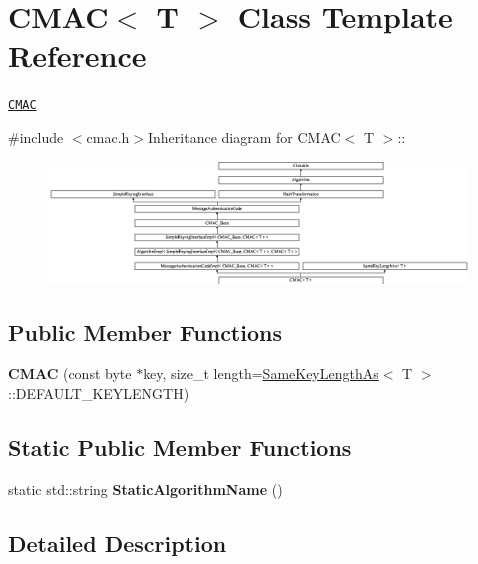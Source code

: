 \hypertarget{class_c_m_a_c}{
\section{CMAC$<$ T $>$ Class Template Reference}
\label{class_c_m_a_c}
}


\href{http://www.cryptolounge.org/wiki/CMAC}{\tt CMAC}  


{\ttfamily \#include $<$cmac.h$>$}Inheritance diagram for CMAC$<$ T $>$::\begin{figure}[H]
\begin{center}
\leavevmode
\includegraphics[height=3.23077cm]{class_c_m_a_c}
\end{center}
\end{figure}
\subsection*{Public Member Functions}
\begin{DoxyCompactItemize}
\item 
\hypertarget{class_c_m_a_c_ab095b5454838c35e1ccfe779c1c7cea5}{
{\bfseries CMAC} (const byte $\ast$key, size\_\-t length=\hyperlink{class_same_key_length_as}{SameKeyLengthAs}$<$ T $>$::DEFAULT\_\-KEYLENGTH)}
\label{class_c_m_a_c_ab095b5454838c35e1ccfe779c1c7cea5}

\end{DoxyCompactItemize}
\subsection*{Static Public Member Functions}
\begin{DoxyCompactItemize}
\item 
\hypertarget{class_c_m_a_c_aead17409f0c8e789bce3d1b57c0647b7}{
static std::string {\bfseries StaticAlgorithmName} ()}
\label{class_c_m_a_c_aead17409f0c8e789bce3d1b57c0647b7}

\end{DoxyCompactItemize}


\subsection{Detailed Description}
